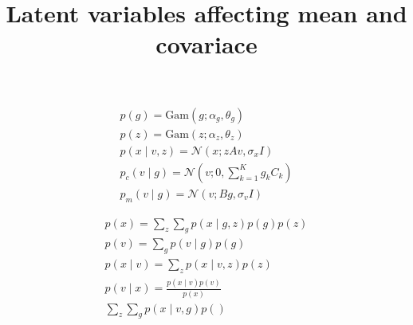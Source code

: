 \documentclass{paper}
\begin{document}
\title{Latent variables affecting mean and covariace}
\maketitle

\begin{eqnarray}
p(g) = \textrm{Gam}(g; \alpha_g,\theta_g) \\
p(z) = \textrm{Gam}(z; \alpha_z,\theta_z) \\
p(x \mid v,z) = \mathcal{N}(x; zAv,\sigma_x I) \\
p_c(v \mid g) = \mathcal{N}(v; 0,\sum_{k=1}^K g_k C_k) \\
p_m(v \mid g) = \mathcal{N}(v; Bg,\sigma_v I)
\end{eqnarray}

\begin{eqnarray}
p(x) =  \sum_z \sum_g p(x \mid g,z) p(g) p(z) \\
p(v) = \sum_g p(v \mid g) p(g) \\
p(x \mid v) = \sum_z p(x \mid v,z) p(z) \\
p(v \mid x) = \frac{p(x \mid v) p(v)}{p(x)} \\
 \sum_z \sum_g p(x \mid v,g) p()
\end{eqnarray}
\end{document}
